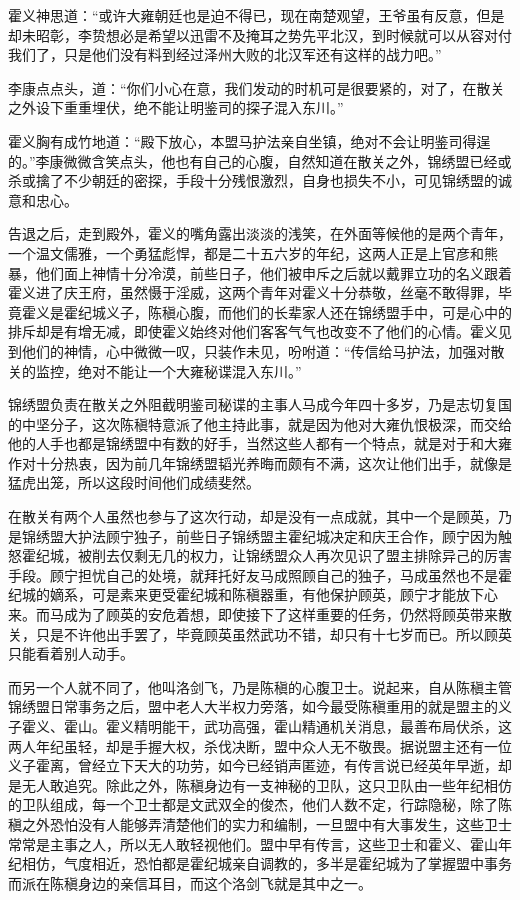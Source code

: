 霍义神思道：“或许大雍朝廷也是迫不得已，现在南楚观望，王爷虽有反意，但是却未昭彰，李贽想必是希望以迅雷不及掩耳之势先平北汉，到时候就可以从容对付我们了，只是他们没有料到经过泽州大败的北汉军还有这样的战力吧。”

李康点点头，道：“你们小心在意，我们发动的时机可是很要紧的，对了，在散关之外设下重重埋伏，绝不能让明鉴司的探子混入东川。”

霍义胸有成竹地道：“殿下放心，本盟马护法亲自坐镇，绝对不会让明鉴司得逞的。”李康微微含笑点头，他也有自己的心腹，自然知道在散关之外，锦绣盟已经或杀或擒了不少朝廷的密探，手段十分残恨激烈，自身也损失不小，可见锦绣盟的诚意和忠心。

告退之后，走到殿外，霍义的嘴角露出淡淡的浅笑，在外面等候他的是两个青年，一个温文儒雅，一个勇猛彪悍，都是二十五六岁的年纪，这两人正是上官彦和熊暴，他们面上神情十分冷漠，前些日子，他们被申斥之后就以戴罪立功的名义跟着霍义进了庆王府，虽然慑于淫威，这两个青年对霍义十分恭敬，丝毫不敢得罪，毕竟霍义是霍纪城义子，陈稹心腹，而他们的长辈家人还在锦绣盟手中，可是心中的排斥却是有增无减，即使霍义始终对他们客客气气也改变不了他们的心情。霍义见到他们的神情，心中微微一叹，只装作未见，吩咐道：“传信给马护法，加强对散关的监控，绝对不能让一个大雍秘谍混入东川。”

锦绣盟负责在散关之外阻截明鉴司秘谍的主事人马成今年四十多岁，乃是志切复国的中坚分子，这次陈稹特意派了他主持此事，就是因为他对大雍仇恨极深，而交给他的人手也都是锦绣盟中有数的好手，当然这些人都有一个特点，就是对于和大雍作对十分热衷，因为前几年锦绣盟韬光养晦而颇有不满，这次让他们出手，就像是猛虎出笼，所以这段时间他们成绩斐然。

在散关有两个人虽然也参与了这次行动，却是没有一点成就，其中一个是顾英，乃是锦绣盟大护法顾宁独子，前些日子锦绣盟主霍纪城决定和庆王合作，顾宁因为触怒霍纪城，被削去仅剩无几的权力，让锦绣盟众人再次见识了盟主排除异己的厉害手段。顾宁担忧自己的处境，就拜托好友马成照顾自己的独子，马成虽然也不是霍纪城的嫡系，可是素来更受霍纪城和陈稹器重，有他保护顾英，顾宁才能放下心来。而马成为了顾英的安危着想，即使接下了这样重要的任务，仍然将顾英带来散关，只是不许他出手罢了，毕竟顾英虽然武功不错，却只有十七岁而已。所以顾英只能看着别人动手。

而另一个人就不同了，他叫洛剑飞，乃是陈稹的心腹卫士。说起来，自从陈稹主管锦绣盟日常事务之后，盟中老人大半权力旁落，如今最受陈稹重用的就是盟主的义子霍义、霍山。霍义精明能干，武功高强，霍山精通机关消息，最善布局伏杀，这两人年纪虽轻，却是手握大权，杀伐决断，盟中众人无不敬畏。据说盟主还有一位义子霍离，曾经立下天大的功劳，如今已经销声匿迹，有传言说已经英年早逝，却是无人敢追究。除此之外，陈稹身边有一支神秘的卫队，这只卫队由一些年纪相仿的卫队组成，每一个卫士都是文武双全的俊杰，他们人数不定，行踪隐秘，除了陈稹之外恐怕没有人能够弄清楚他们的实力和编制，一旦盟中有大事发生，这些卫士常常是主事之人，所以无人敢轻视他们。盟中早有传言，这些卫士和霍义、霍山年纪相仿，气度相近，恐怕都是霍纪城亲自调教的，多半是霍纪城为了掌握盟中事务而派在陈稹身边的亲信耳目，而这个洛剑飞就是其中之一。


